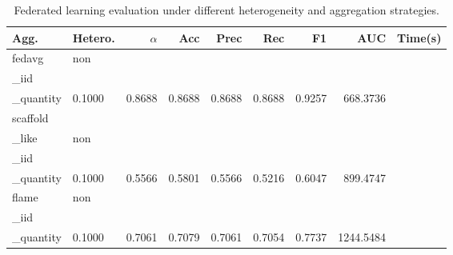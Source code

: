 \begin{table}[t]
\centering
\caption{Federated learning evaluation under different heterogeneity and aggregation strategies.}\n\label{tab:phase2_federated_results}\n\begin{tabular}{l l r r r r r r r}\n\hline
Agg. & Hetero. & $\alpha$ & Acc & Prec & Rec & F1 & AUC & Time(s) \\ \hline
fedavg & non\\_iid\\_quantity & 0.1000 & 0.8688 & 0.8688 & 0.8688 & 0.8688 & 0.9257 & 668.3736 \\ 
scaffold\\_like & non\\_iid\\_quantity & 0.1000 & 0.5566 & 0.5801 & 0.5566 & 0.5216 & 0.6047 & 899.4747 \\ 
flame & non\\_iid\\_quantity & 0.1000 & 0.7061 & 0.7079 & 0.7061 & 0.7054 & 0.7737 & 1244.5484 \\ 
\hline
\end{tabular}
\end{table}
